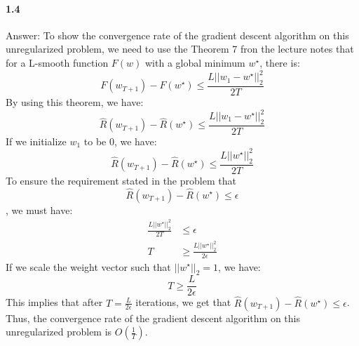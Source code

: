 \documentclass[11pt]{article}
\begin{document}
\paragraph{1.4}
Answer:
\newline
To show the convergence rate of the gradient descent algorithm on this unregularized problem, we need to use the Theorem 7 fron the lecture notes that
for a L-smooth function $F(w)$ with a global minimum $w^\star$, there is:
\begin{equation}
    F(w_{T+1})-F(w^\star) \leq \frac{L||w_1-w^\star||_2^2}{2 T}
\end{equation}
By using this theorem, we have:
\begin{equation}
    \hat{R}(w_{T+1})-\hat{R}(w^\star) \leq \frac{L||w_1-w^\star||_2^2}{2 T}
\end{equation}
If we initialize $w_1$ to be $0$, we have:
\begin{equation}
    \hat{R}(w_{T+1})-\hat{R}(w^\star) \leq \frac{L||w^\star||_2^2}{2 T}
\end{equation}
To ensure the requirement stated in the problem that 
\begin{equation}
    \hat{R}(w_{T+1})-\hat{R}(w^\star) \leq \epsilon
\end{equation}
, we must have:
\begin{equation}
    \begin{split}
        \frac{L||w^\star||_2^2}{2 T} &\leq \epsilon \\
        T &\geq \frac{L||w^\star||_2^2}{2\epsilon}
    \end{split}
\end{equation}
If we scale the weight vector such that $||w^\star||_2 = 1$, we have:
\begin{equation}
    T \geq \frac{L}{2\epsilon}
\end{equation}
This implies that after $T=\frac{L}{2\epsilon}$ iterations, we get that $\hat{R}(w_{T+1})-\hat{R}(w^\star) \leq \epsilon$.
Thus, the convergence rate of the gradient descent algorithm on this unregularized problem is $O(\frac{1}{T})$.
\end{document}
